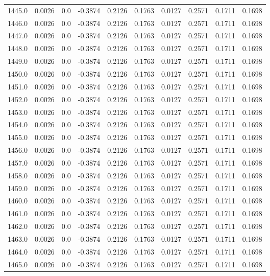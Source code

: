 \begin{longtable}{lrrrrrrrrr}
1445.0 & 0.0026 & 0.0 & -0.3874 & 0.2126 & 0.1763 & 0.0127 & 0.2571 & 0.1711 & 0.1698 \\
1446.0 & 0.0026 & 0.0 & -0.3874 & 0.2126 & 0.1763 & 0.0127 & 0.2571 & 0.1711 & 0.1698 \\
1447.0 & 0.0026 & 0.0 & -0.3874 & 0.2126 & 0.1763 & 0.0127 & 0.2571 & 0.1711 & 0.1698 \\
1448.0 & 0.0026 & 0.0 & -0.3874 & 0.2126 & 0.1763 & 0.0127 & 0.2571 & 0.1711 & 0.1698 \\
1449.0 & 0.0026 & 0.0 & -0.3874 & 0.2126 & 0.1763 & 0.0127 & 0.2571 & 0.1711 & 0.1698 \\
1450.0 & 0.0026 & 0.0 & -0.3874 & 0.2126 & 0.1763 & 0.0127 & 0.2571 & 0.1711 & 0.1698 \\
1451.0 & 0.0026 & 0.0 & -0.3874 & 0.2126 & 0.1763 & 0.0127 & 0.2571 & 0.1711 & 0.1698 \\
1452.0 & 0.0026 & 0.0 & -0.3874 & 0.2126 & 0.1763 & 0.0127 & 0.2571 & 0.1711 & 0.1698 \\
1453.0 & 0.0026 & 0.0 & -0.3874 & 0.2126 & 0.1763 & 0.0127 & 0.2571 & 0.1711 & 0.1698 \\
1454.0 & 0.0026 & 0.0 & -0.3874 & 0.2126 & 0.1763 & 0.0127 & 0.2571 & 0.1711 & 0.1698 \\
1455.0 & 0.0026 & 0.0 & -0.3874 & 0.2126 & 0.1763 & 0.0127 & 0.2571 & 0.1711 & 0.1698 \\
1456.0 & 0.0026 & 0.0 & -0.3874 & 0.2126 & 0.1763 & 0.0127 & 0.2571 & 0.1711 & 0.1698 \\
1457.0 & 0.0026 & 0.0 & -0.3874 & 0.2126 & 0.1763 & 0.0127 & 0.2571 & 0.1711 & 0.1698 \\
1458.0 & 0.0026 & 0.0 & -0.3874 & 0.2126 & 0.1763 & 0.0127 & 0.2571 & 0.1711 & 0.1698 \\
1459.0 & 0.0026 & 0.0 & -0.3874 & 0.2126 & 0.1763 & 0.0127 & 0.2571 & 0.1711 & 0.1698 \\
1460.0 & 0.0026 & 0.0 & -0.3874 & 0.2126 & 0.1763 & 0.0127 & 0.2571 & 0.1711 & 0.1698 \\
1461.0 & 0.0026 & 0.0 & -0.3874 & 0.2126 & 0.1763 & 0.0127 & 0.2571 & 0.1711 & 0.1698 \\
1462.0 & 0.0026 & 0.0 & -0.3874 & 0.2126 & 0.1763 & 0.0127 & 0.2571 & 0.1711 & 0.1698 \\
1463.0 & 0.0026 & 0.0 & -0.3874 & 0.2126 & 0.1763 & 0.0127 & 0.2571 & 0.1711 & 0.1698 \\
1464.0 & 0.0026 & 0.0 & -0.3874 & 0.2126 & 0.1763 & 0.0127 & 0.2571 & 0.1711 & 0.1698 \\
1465.0 & 0.0026 & 0.0 & -0.3874 & 0.2126 & 0.1763 & 0.0127 & 0.2571 & 0.1711 & 0.1698 \\

\end{longtable}
